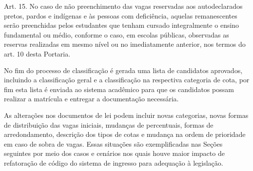 \begin{citacao}
Art. 15. No caso de não preenchimento das vagas reservadas aos autodeclarados pretos, pardos
e indígenas e às pessoas com deficiência, aquelas remanescentes serão preenchidas pelos
estudantes que tenham cursado integralmente o ensino fundamental ou médio, conforme o caso,
em escolas públicas, observadas as reservas realizadas em mesmo nível ou no imediatamente
anterior, nos termos do art. 10 desta Portaria. \cite{portarianr9}
\end{citacao}

No fim do processo de classificação é gerada uma lista de candidatos aprovados, incluindo a classificação geral e a classificação na respectiva categoria de cota, por fim esta lista é enviada ao sistema acadêmico para que os candidatos possam realizar a matrícula e entregar a documentação necessária. 

As alterações nos documentos de lei podem incluir novas categorias, novas formas de distribuição das vagas iniciais, mudanças de percentuais, formas de arredondamento, descrição dos tipos de cotas e mudança na ordem de prioridade em caso de sobra de vagas. Essas situações são exemplificadas nas Seções seguintes por meio dos casos e cenários nos quais houve maior impacto de refatoração de código do sistema de ingresso para adequação à legislação.









